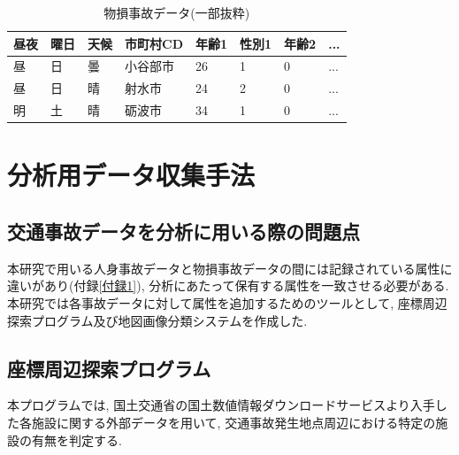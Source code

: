 \documentclass[a4j,8.5pt, twocolumn,fleqn]{jbook}
\begin{document}
\begin{table}[htb]
    \caption{物損事故データ(一部抜粋)}
    \label{物損事故データ}
    \small
    \begin{tabular}{|l|l|l|l|l|l|l|l|}
        \hline
        \textbf{昼夜} & \textbf{曜日} & \textbf{天候} & \textbf{市町村CD} & \textbf{年齢1} & \textbf{性別1} & \textbf{年齢2} & \textbf{...} \\ \hline
        昼           & 日           & 曇           & 小谷部市           & 26              & 1               & 0               & ...          \\ \hline
        昼           & 日           & 晴           & 射水市            & 24              & 2               & 0               & ...          \\ \hline
        明           & 土           & 晴           & 砺波市            & 34              & 1               & 0               & ...          \\ \hline
    \end{tabular}
\end{table}




\section{分析用データ収集手法}
\subsection{交通事故データを分析に用いる際の問題点}
本研究で用いる人身事故データと物損事故データの間には記録されている属性に違いがあり(付録\ref{付録1}), 分析にあたって保有する属性を一致させる必要がある. 
本研究では各事故データに対して属性を追加するためのツールとして, 座標周辺探索プログラム及び地図画像分類システムを作成した. 

\subsection{座標周辺探索プログラム}
本プログラムでは, 国土交通省の国土数値情報ダウンロードサービス\cite{国土数値情報ダウンロードサービス}より入手した各施設に関する外部データを用いて, 交通事故発生地点周辺における特定の施設の有無を判定する. 
\end{document}
